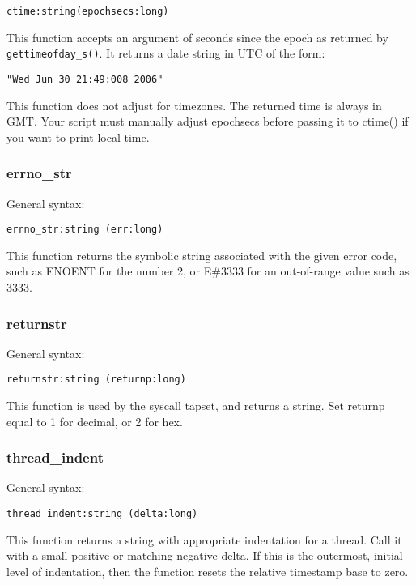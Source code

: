 \documentclass[twoside,english]{article}
\newenvironment{vindent}
{\begin{list}{}{\setlength{\listparindent}{6pt}}
\item[]}
{\end{list}}
\begin{document}
\begin{vindent}
\begin{verbatim}
ctime:string(epochsecs:long)
\end{verbatim}
\end{vindent}
This function accepts an argument of seconds since the epoch as returned
by \texttt{gettimeofday\_s()}. It returns a date string in UTC of the form:

\begin{vindent}
\begin{verbatim}
"Wed Jun 30 21:49:008 2006"
\end{verbatim}
\end{vindent}
This function does not adjust for timezones. The returned time is always
in GMT. Your script must manually adjust epochsecs before passing it to ctime()
if you want to print local time.


\subsubsection{errno\_str}
General syntax:

\begin{vindent}
\begin{verbatim}
errno_str:string (err:long)
\end{verbatim}
\end{vindent}
This function returns the symbolic string associated with the given error
code, such as ENOENT for the number 2, or E\#3333 for an out-of-range value
such as 3333.


\subsubsection{returnstr}
General syntax:

\begin{vindent}
\begin{verbatim}
returnstr:string (returnp:long)
\end{verbatim}
\end{vindent}
This function is used by the syscall tapset, and returns a string. Set \texttt{}returnp
equal to 1 for decimal, or 2 for hex.


\subsubsection{thread\_indent}
General syntax:

\begin{vindent}
\begin{verbatim}
thread_indent:string (delta:long)
\end{verbatim}
\end{vindent}
This function returns a string with appropriate indentation for a thread.
Call it with a small positive or matching negative delta. If this is the
outermost, initial level of indentation, then the function resets the relative
timestamp base to zero.
\end{document}
